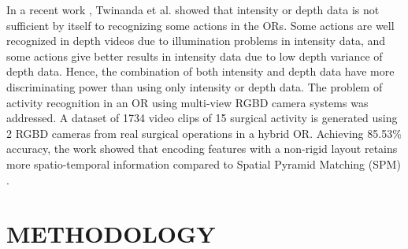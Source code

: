 \documentclass[a4paper, 10pt, conference]{ieeeconf}      %
\begin{document}
    In a recent work \cite{c1}, Twinanda et al. showed that intensity or depth data is not sufficient by itself to recognizing some actions in the ORs. Some actions are well recognized in depth videos due to illumination problems in intensity data, and some actions give better results in intensity data due to low depth variance of depth data. Hence, the combination of both intensity and depth data have more discriminating power than using only intensity or depth data. The problem of activity recognition in an OR using multi-view RGBD camera systems was addressed. A dataset of 1734 video clips of 15 surgical activity is generated using 2 RGBD cameras from real surgical operations in a hybrid OR. Achieving 85.53\% accuracy, the work showed that encoding features with a non-rigid layout retains more spatio-temporal information compared to Spatial Pyramid Matching (SPM) \cite{c8}.
    


\addtolength{\textheight}{-3cm}   %

\section{METHODOLOGY}
\label{section:methodology}

\end{document}
